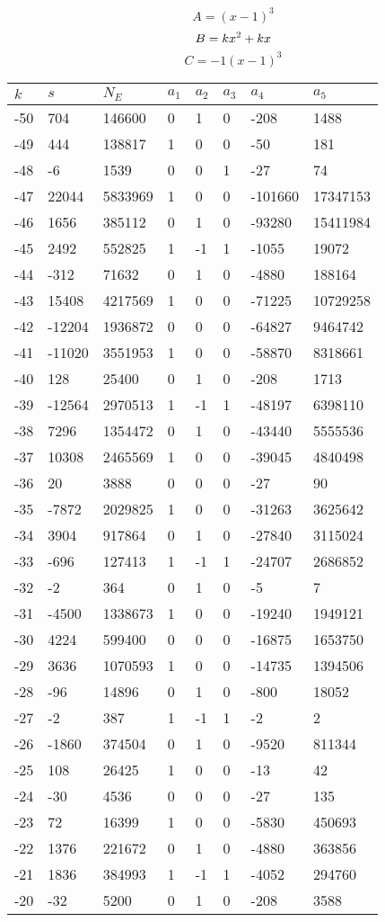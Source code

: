 \documentclass{amsart}
\begin{document}
$$A=(x
 - 1)^{3}$$
$$B=k\*x^2
 + k\*x$$
$$C=-1(x
 - 1)^{3}$$
\begin{longtable}{|l|l|l|lllll|}
\hline
$k$ & $s$ & $N_E$ & $a_1$ & $a_2$ & $a_3$ & $a_4$ & $a_5$\\
\hline
-50&704&146600&0&1&0&-208&1488\\
-49&444&138817&1&0&0&-50&181\\
-48&-6&1539&0&0&1&-27&74\\
-47&22044&5833969&1&0&0&-101660&17347153\\
-46&1656&385112&0&1&0&-93280&15411984\\
-45&2492&552825&1&-1&1&-1055&19072\\
-44&-312&71632&0&1&0&-4880&188164\\
-43&15408&4217569&1&0&0&-71225&10729258\\
-42&-12204&1936872&0&0&0&-64827&9464742\\
-41&-11020&3551953&1&0&0&-58870&8318661\\
-40&128&25400&0&1&0&-208&1713\\
-39&-12564&2970513&1&-1&1&-48197&6398110\\
-38&7296&1354472&0&1&0&-43440&5555536\\
-37&10308&2465569&1&0&0&-39045&4840498\\
-36&20&3888&0&0&0&-27&90\\
-35&-7872&2029825&1&0&0&-31263&3625642\\
-34&3904&917864&0&1&0&-27840&3115024\\
-33&-696&127413&1&-1&1&-24707&2686852\\
-32&-2&364&0&1&0&-5&7\\
-31&-4500&1338673&1&0&0&-19240&1949121\\
-30&4224&599400&0&0&0&-16875&1653750\\
-29&3636&1070593&1&0&0&-14735&1394506\\
-28&-96&14896&0&1&0&-800&18052\\
-27&-2&387&1&-1&1&-2&2\\
-26&-1860&374504&0&1&0&-9520&811344\\
-25&108&26425&1&0&0&-13&42\\
-24&-30&4536&0&0&0&-27&135\\
-23&72&16399&1&0&0&-5830&450693\\
-22&1376&221672&0&1&0&-4880&363856\\
-21&1836&384993&1&-1&1&-4052&294760\\
-20&-32&5200&0&1&0&-208&3588\\

\end{longtable}
\end{document}
